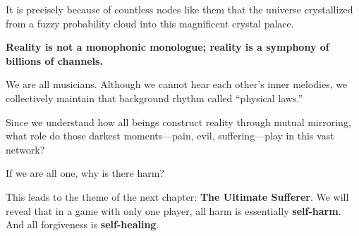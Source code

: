 It is precisely because of countless nodes like them that the universe crystallized from a fuzzy probability cloud into this magnificent crystal palace.

\textbf{Reality is not a monophonic monologue; reality is a symphony of billions of channels.}

We are all musicians. Although we cannot hear each other's inner melodies, we collectively maintain that background rhythm called ``physical laws.''

Since we understand how all beings construct reality through mutual mirroring, what role do those darkest moments---pain, evil, suffering---play in this vast network?

If we are all one, why is there harm?

This leads to the theme of the next chapter: \textbf{The Ultimate Sufferer}. We will reveal that in a game with only one player, all harm is essentially \textbf{self-harm}. And all forgiveness is \textbf{self-healing}.

